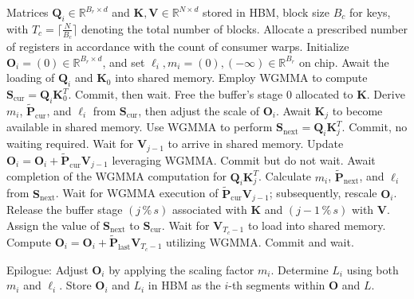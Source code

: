 \begin{enumerate}
\begin{algorithm}[H]
    \caption{\small\label{alg:flash3_wgmma}\textsc{FlashAttention-3} consumer warpgroup forward pass}
    \begin{algorithmic}[1]
      \REQUIRE  Matrices $\mathbf{Q}_i \in \mathbb{R}^{B_r \times d}$ and $\mathbf{K}, \mathbf{V} \in \mathbb{R}^{N \times d}$ stored in HBM, block size $B_c$ for keys, with $T_c = \lceil \frac{N}{B_c} \rceil$ denoting the total number of blocks.
      \STATE Allocate a prescribed number of registers in accordance with the count of consumer warps.
      \STATE Initialize $\mathbf{O}_i = (0) \in \mathbb{R}^{B_r \times d}$, and set $\ell_i, m_i = (0), (-\infty) \in \mathbb{R}^{B_r}$ on chip.
      \STATE Await the loading of $\mathbf{Q}_i$ and $\mathbf{K}_0$ into shared memory.
      \STATE Employ WGMMA to compute $\mathbf{S}_{\mathrm{cur}} = \mathbf{Q}_i \mathbf{K}_0^T$. Commit, then wait.
      \STATE Free the buffer's stage $0$ allocated to $\mathbf{K}$.
      \STATE Derive $m_{i}$, $\tilde{\mathbf{P}}_{\mathrm{cur}}$, and $\ell_{i}$ from $\mathbf{S}_{\mathrm{cur}}$, then adjust the scale of $\mathbf{O}_i$.
        \STATE Await $\mathbf{K}_j$ to become available in shared memory.
        \label{code:mainloop_start}
        \STATE Use WGMMA to perform $\mathbf{S}_{\mathrm{next}} = \mathbf{Q}_i \mathbf{K}_{j}^T$. Commit, no waiting required. \label{code:first_wgmma}
        \STATE Wait for $\mathbf{V}_{j-1}$ to arrive in shared memory.
        \STATE Update $\mathbf{O}_{i} = \mathbf{O}_{i} + \tilde{\mathbf{P}}_{\mathrm{cur}} \mathbf{V}_{j-1}$ leveraging WGMMA. Commit but do not wait. \label{code:second_wgmma}
        \STATE Await completion of the WGMMA computation for $\mathbf{Q}_i \mathbf{K}_{j}^T$.
        \STATE Calculate $m_{i}$, $\tilde{\mathbf{P}}_{\mathrm{next}}$, and $\ell_{i}$ from $\mathbf{S}_{\mathrm{next}}$. \label{code:softmax}
        \STATE Wait for WGMMA execution of $\tilde{\mathbf{P}}_{\mathrm{cur}} \mathbf{V}_{j-1}$; subsequently, rescale $\mathbf{O}_i$.
        \STATE Release the buffer stage $(j\,\%\,s)$ associated with $\mathbf{K}$ and $(j-1\,\%\,s)$ with $\mathbf{V}$.
        \STATE Assign the value of $\mathbf{S}_{\mathrm{next}}$ to $\mathbf{S}_{\mathrm{cur}}$.
        \label{code:mainloop_end}
      \ENDFOR \STATE Wait for $\mathbf{V}_{T_c - 1}$ to load into shared memory.
      \STATE Compute
      $\mathbf{O}_{i} = \mathbf{O}_{i} + \tilde{\mathbf{P}}_{\mathrm{last}} \mathbf{V}_{T_c - 1}$ utilizing WGMMA. Commit and wait.

\STATE Epilogue: Adjust $\mathbf{O}_{i}$ by applying the scaling factor $m_{i}$. Determine $L_{i}$ using both $m_{i}$ and $\ell_{i}$.
Store $\mathbf{O}_{i}$ and $L_{i}$ in HBM as the $i$-th segments within $\mathbf{O}$ and $L$.


\end{algorithmic}
\end{algorithm}
\end{enumerate}
